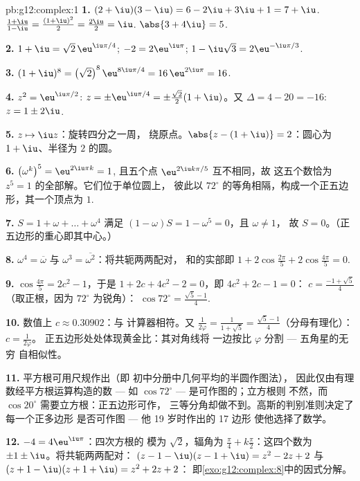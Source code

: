 \begin{solution}{pb:g12:complex:1}
\textbf{1.} $(2 + \iu)(3 - \iu) = 6 - 2\iu + 3\iu + 1 =
7 + \iu$. \quad $\frac{1 + \iu}{1 - \iu} =
\frac{(1 + \iu)^2}{2} = \frac{2\iu}{2} = \iu$. \quad
$\abs{3 + 4\iu} = 5$.

\textbf{2.} $1 + \iu = \sqrt2\,\eu^{\iu\pi/4}$;
$-2 = 2\eu^{\iu\pi}$;
$1 - \iu\sqrt3 = 2\eu^{-\iu\pi/3}$.

\textbf{3.} $(1 + \iu)^8 = \left(\sqrt2\right)^8
\eu^{8\iu\pi/4} = 16\,\eu^{2\iu\pi} = 16$.

\textbf{4.} $z^2 = \eu^{\iu\pi/2}$:
$z = \pm\eu^{\iu\pi/4} = \pm\frac{\sqrt2}{2}(1 + \iu)$。又
$\Delta = 4 - 20 = -16$: $z = 1 \pm 2\iu$.

\textbf{5.} $z \mapsto \iu z$：旋转四分之一周，
绕原点。$\abs{z - (1 + \iu)} = 2$：圆心为
$1 + \iu$、半径为 $2$ 的圆。

\textbf{6.} $\left(\omega^k\right)^5 = \eu^{2\iu\pi k} = 1$,
且五个点 $\eu^{2\iu k\pi/5}$ 互不相同，故
这五个数恰为 $z^5 = 1$ 的全部解。它们位于单位圆上，
彼此以 $72^\circ$ 的等角相隔，构成一个正五边形，其一个顶点为
$1$.

\textbf{7.} $S = 1 + \omega + \dots + \omega^4$ 满足
$(1 - \omega)S = 1 - \omega^5 = 0$，且 $\omega \neq 1$，
故 $S = 0$。（正五边形的重心即其中心。）

\textbf{8.} $\omega^4 = \overline\omega$ 与
$\omega^3 = \overline{\omega^2}$：将共轭两两配对，
和的实部即
$1 + 2\cos\frac{2\pi}{5} + 2\cos\frac{4\pi}{5} = 0$.

\textbf{9.} $\cos\frac{4\pi}{5} = 2c^2 - 1$，于是
$1 + 2c + 4c^2 - 2 = 0$，即 $4c^2 + 2c - 1 = 0$：
$c = \frac{-1 + \sqrt5}{4}$（取正根，因为
$72^\circ$ 为锐角）：
$\cos 72^\circ = \frac{\sqrt5 - 1}{4}$.

\textbf{10.} 数值上 $c \approx 0.30902$：与
计算器相符。又 $\frac{1}{2\varphi} = \frac{1}{1 + \sqrt5} =
\frac{\sqrt5 - 1}{4}$（分母有理化）：$c = \frac{1}{2\varphi}$。
正五边形处处体现黄金比：其对角线将
一边按比 $\varphi$ 分割 --- 五角星的无穷
自相似性。

\textbf{11.} 平方根可用尺规作出（即
初中分册中几何平均的半圆作图法），
因此仅由有理数经平方根运算构造的数
--- 如 $\cos 72^\circ$ --- 是可作图的；立方根则
不然，而 $\cos 20^\circ$ 需要立方根：正五边形可作，
三等分角却做不到。高斯的判别准则决定了每一个正多边形
是否可作图 --- 他 19 岁时作出的 17 边形
使他选择了数学。

\textbf{12.} $-4 = 4\eu^{\iu\pi}$：四次方根的
模为 $\sqrt2$，辐角为
$\frac{\pi}{4} + k\frac{\pi}{2}$：这四个数为
$\pm 1 \pm \iu$。将共轭两两配对：
$(z - 1 - \iu)(z - 1 + \iu) = z^2 - 2z + 2$ 与
$(z + 1 - \iu)(z + 1 + \iu) = z^2 + 2z + 2$：
即\cref{exo:g12:complex:8}中的因式分解。


\end{solution}
